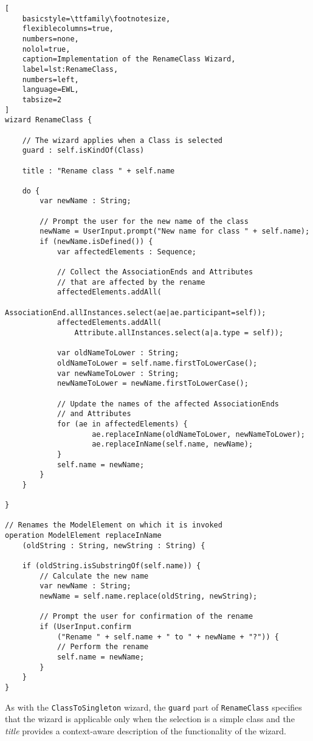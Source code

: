 \begin{lstlisting}[ 
	basicstyle=\ttfamily\footnotesize, 
	flexiblecolumns=true, 
	numbers=none, 
	nolol=true, 
	caption=Implementation of the RenameClass Wizard,
	label=lst:RenameClass, 
	numbers=left, 
	language=EWL, 
	tabsize=2
]
wizard RenameClass {
	
	// The wizard applies when a Class is selected
	guard : self.isKindOf(Class)
	
	title : "Rename class " + self.name
	
	do {
		var newName : String;
		
		// Prompt the user for the new name of the class
		newName = UserInput.prompt("New name for class " + self.name);
		if (newName.isDefined()) {
			var affectedElements : Sequence;
			
			// Collect the AssociationEnds and Attributes
			// that are affected by the rename
			affectedElements.addAll(
				AssociationEnd.allInstances.select(ae|ae.participant=self));
			affectedElements.addAll(
				Attribute.allInstances.select(a|a.type = self));
			
			var oldNameToLower : String;
			oldNameToLower = self.name.firstToLowerCase();
			var newNameToLower : String;
			newNameToLower = newName.firstToLowerCase();
			
			// Update the names of the affected AssociationEnds
			// and Attributes
			for (ae in affectedElements) {
					ae.replaceInName(oldNameToLower, newNameToLower);
					ae.replaceInName(self.name, newName);
			}
			self.name = newName;
		}
	}
	
}

// Renames the ModelElement on which it is invoked
operation ModelElement replaceInName
	(oldString : String, newString : String) {
	
	if (oldString.isSubstringOf(self.name)) {
		// Calculate the new name
		var newName : String;
		newName = self.name.replace(oldString, newString);
		
		// Prompt the user for confirmation of the rename
		if (UserInput.confirm
			("Rename " + self.name + " to " + newName + "?")) {
			// Perform the rename
			self.name = newName;
		}
	}
}
\end{lstlisting}
As with the \texttt{ClassToSingleton} wizard, the \texttt{guard} part of \texttt{RenameClass} specifies that the wizard is applicable only when the selection is a simple class and the \emph{title} provides a context-aware description of the functionality of the wizard. 

